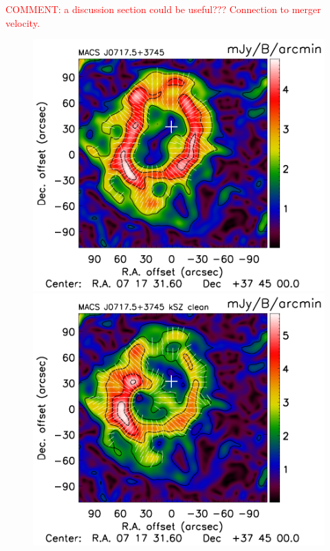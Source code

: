 \documentclass[twocolumn,traditabstract]{aa}
\begin{document}
\textcolor{red}{COMMENT: a discussion section could be useful??? Connection to merger velocity.}

\begin{figure}[h]
\centering
\includegraphics[trim=0cm 0cm 0cm 0cm, clip=true, totalheight=3.8cm]{Figure/Grad_MACSJ0717_15_15_45.pdf}
\includegraphics[trim=0cm 0cm 0cm 0cm, clip=true, totalheight=3.8cm]{Figure/Grad_MACSJ0717kSZ_15_15_45.pdf}

\end{figure}
\end{document}
